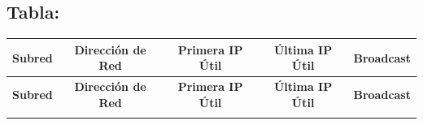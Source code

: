 \documentclass[letterpaper,12pt]{article}
\begin{document}
    \subsection{Tabla:}

    \begin{center}
        \begin{longtable}{|c|c|c|c|c|}
        \hline
        \textbf{Subred} & \textbf{Dirección de Red} & \textbf{Primera IP Útil} & \textbf{Última IP Útil} & \textbf{Broadcast} \\ \hline
        \endfirsthead

        \hline
        \textbf{Subred} & \textbf{Dirección de Red} & \textbf{Primera IP Útil} & \textbf{Última IP Útil} & \textbf{Broadcast} \\ \hline
        \endhead

        \endfoot

        \hline
        \endlastfoot


\end{longtable}
\end{center}
\end{document}
